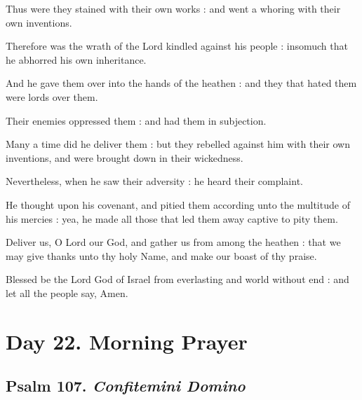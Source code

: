 Thus were they stained with their own works : and went a whoring with their own inventions.\par
{}Therefore was the wrath of the Lord kindled against his people : insomuch that he abhorred his own inheritance.\par
{}And he gave them over into the hands of the heathen : and they that hated them were lords over them.\par
{}Their enemies oppressed them : and had them in subjection.\par
{}Many a time did he deliver them : but they rebelled against him with their own inventions, and were brought down in their wickedness.\par
{}Nevertheless, when he saw their adversity : he heard their complaint.\par
{}He thought upon his covenant, and pitied them according unto the multitude of his mercies : yea, he made all those that led them away captive to pity them.\par
{}Deliver us, O Lord our God, and gather us from among the heathen : that we may give thanks unto thy holy Name, and make our boast of thy praise.\par
{}Blessed be the Lord God of Israel from everlasting and world without end : and let all the people say, Amen.\par

\section*{Day 22. Morning Prayer}

\subsection{Psalm 107. \textit{Confitemini Domino}}

